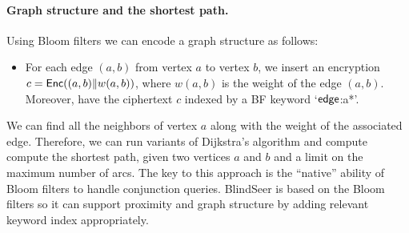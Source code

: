 \paragraph{Graph structure and the shortest path.}
Using Bloom filters we can encode a graph structure as follows:
\begin{itemize}
\item For each edge $(a, b)$ from vertex $a$ to vertex $b$, we insert an
  encryption $c = \mathsf{Enc}((a,b) \| w(a,b) )$, where $w(a,b)$ is the weight of the edge
    $(a,b)$. Moreover, have the ciphertext $c$ indexed by a BF keyword `$\sf edge$:a*'. 
\end{itemize}

\noindent
We can find all the neighbors of vertex $a$ along with the weight of the
associated edge. Therefore, we can run variants of Dijkstra's algorithm and
compute compute the shortest path, given two vertices $a$ and $b$ and a limit
on the maximum number of arcs. The key to this approach is the ``native''
ability of Bloom filters to handle conjunction queries.  BlindSeer is based on
the Bloom filters so it can support proximity and graph structure by adding
relevant keyword index appropriately.
%
